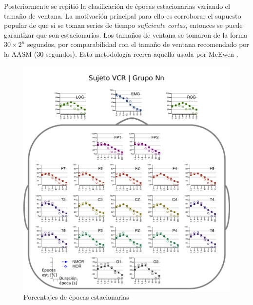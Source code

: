 Posteriormente se repitió la clasificación de épocas estacionarias variando el tamaño de ventana. 
La motivación principal para ello es corroborar el supuesto popular de que si se toman series de 
tiempo \textit{suficiente cortas}, entonces se puede garantizar que son estacionarias. Los tamaños 
de ventana se tomaron de la forma $30 \times 2^{n}$ segundos, por comparabilidad con el tamaño de 
ventana recomendado por la AASM (30 segundos).
%
Esta metodología recrea aquella usada por McEwen \cite{McEwen75}.




\begin{figure}
\centering
\includegraphics[width=.9\linewidth]{./img_resultados/cabeza_VCR.pdf}
\caption{Porcentajes de épocas estacionarias}
\label{cabeza_repoio}
\end{figure}

